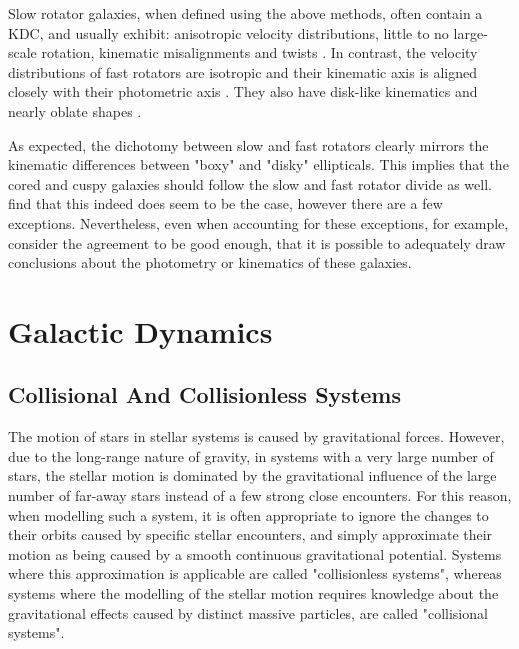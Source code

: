 \documentclass[english, oneside]{HYgradu}
\begin{document}
Slow rotator galaxies, when defined using the above methods, often contain a KDC, and usually exhibit: anisotropic velocity distributions, little to no large-scale rotation, kinematic misalignments and twists \citep{Emsellem2007, Cappellari2007}. In contrast, the velocity distributions of fast rotators are isotropic and their kinematic axis is aligned closely with their photometric axis \citep{Emsellem2007}. They also have disk-like kinematics and nearly oblate shapes \citep{Cappellari2007}. 

As expected, the dichotomy between slow and fast rotators clearly mirrors the kinematic differences between "boxy" and "disky" ellipticals. This implies that the cored and cuspy galaxies should follow the slow and fast rotator divide as well. \cite{Krajnovic2013} find that this indeed does seem to be the case, however there are a few exceptions. Nevertheless, even when accounting for these exceptions, \cite{Cappellari2016} for example, consider the agreement to be good enough, that it is possible to adequately draw conclusions about the photometry or kinematics of these galaxies.

\section{Galactic Dynamics}

\subsection{Collisional And Collisionless Systems}

The motion of stars in stellar systems is caused by gravitational forces. However, due to the long-range nature of gravity, in systems with a very large number of stars, the stellar motion is dominated by the gravitational influence of the large number of far-away stars instead of a few strong close encounters. For this reason, when modelling such a system, it is often appropriate to ignore the changes to their orbits caused by specific stellar encounters, and simply approximate their motion as being caused by a smooth continuous gravitational potential. Systems where this approximation is applicable are called "collisionless systems", whereas systems where the modelling of the stellar motion requires knowledge about the gravitational effects caused by distinct massive particles, are called "collisional systems".
\end{document}
